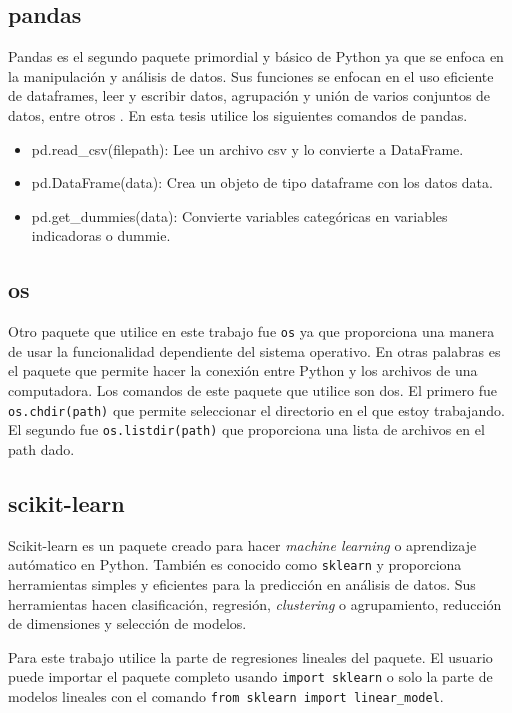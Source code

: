 \subsection{pandas}
Pandas es el segundo paquete primordial y básico de Python ya que se enfoca en la manipulación y análisis de datos. Sus funciones se enfocan en el uso eficiente de dataframes, leer y escribir datos, agrupación y unión de varios conjuntos de datos, entre otros \citep{pandas_manual}. En esta tesis utilice los siguientes comandos de pandas. 

\begin{itemize}
	\item pd.read\_csv(filepath): Lee un archivo csv y lo convierte a DataFrame.
	
	\item pd.DataFrame(data): Crea un objeto de tipo dataframe con los datos data. 
	
	\item pd.get\_dummies(data): Convierte variables categóricas en variables indicadoras o dummie. 
\end{itemize}

\subsection{os}
Otro paquete que utilice en este trabajo fue \texttt{os} ya que proporciona una manera de usar la funcionalidad dependiente del sistema operativo. En otras palabras es el paquete que permite hacer la conexión entre Python y los archivos de una computadora. Los comandos de este paquete que utilice son dos. El primero fue \texttt{os.chdir(path)} que permite seleccionar el directorio en el que estoy trabajando. El segundo fue \texttt{os.listdir(path)} que proporciona una lista de archivos en el path dado. 


\subsection{scikit-learn}
Scikit-learn es un paquete creado para hacer \textit{machine learning} o aprendizaje autómatico en Python. También es conocido como \texttt{sklearn} y proporciona herramientas simples y eficientes para la predicción en análisis de datos. Sus herramientas hacen clasificación, regresión, \textit{clustering} o agrupamiento, reducción de dimensiones y selección de modelos.

Para este trabajo utilice la parte de regresiones lineales del paquete. El usuario puede importar el paquete completo usando \texttt{import sklearn} o solo la parte de modelos lineales con el comando \texttt{from sklearn import linear\_model}. 

